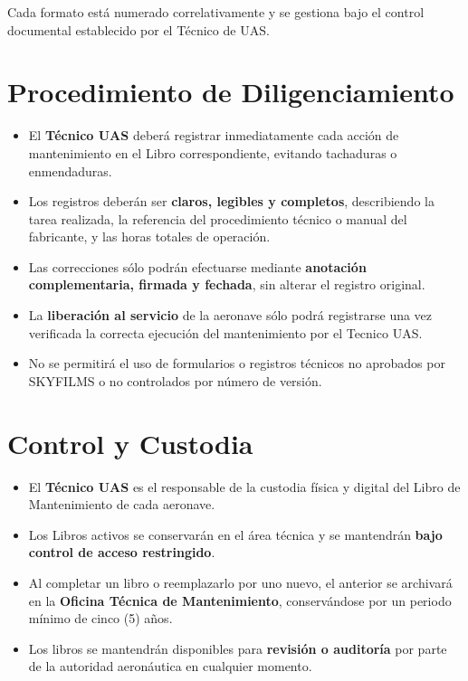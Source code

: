 Cada formato está numerado correlativamente y se gestiona bajo el control documental establecido por el Técnico de UAS.

\section{Procedimiento de Diligenciamiento}

\begin{itemize}
    \item El \textbf{Técnico UAS} deberá registrar inmediatamente cada acción de mantenimiento en el Libro correspondiente, evitando tachaduras o enmendaduras.

    \item Los registros deberán ser \textbf{claros, legibles y completos}, describiendo la tarea realizada, la referencia del procedimiento técnico o manual del fabricante, y las horas totales de operación.

    \item Las correcciones sólo podrán efectuarse mediante \textbf{anotación complementaria, firmada y fechada}, sin alterar el registro original.

    \item La \textbf{liberación al servicio} de la aeronave sólo podrá registrarse una vez verificada la correcta ejecución del mantenimiento por el Tecnico UAS.

    \item No se permitirá el uso de formularios o registros técnicos no aprobados por SKYFILMS o no controlados por número de versión.
\end{itemize}

\section{Control y Custodia}
\begin{itemize}
    \item El \textbf{Técnico UAS} es el responsable de la custodia física y digital del Libro de Mantenimiento de cada aeronave.

    \item Los Libros activos se conservarán en el área técnica y se mantendrán \textbf{bajo control de acceso restringido}.

    \item Al completar un libro o reemplazarlo por uno nuevo, el anterior se archivará en la \textbf{Oficina Técnica de Mantenimiento}, conservándose por un periodo mínimo de cinco (5) años.

    \item Los libros se mantendrán disponibles para \textbf{revisión o auditoría} por parte de la autoridad aeronáutica en cualquier momento.
\end{itemize}

